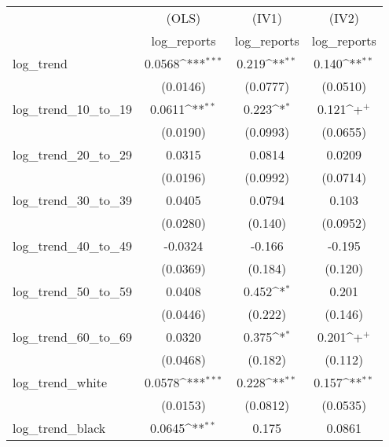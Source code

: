 {
\def\sym#1{\ifmmode^{#1}\else\(^{#1}\)\fi}
\begin{tabular}{l*{3}{c}}
\hline\hline
            &\multicolumn{1}{c}{(OLS)}&\multicolumn{1}{c}{(IV1)}&\multicolumn{1}{c}{(IV2)}\\
            &\multicolumn{1}{c}{log\_reports}&\multicolumn{1}{c}{log\_reports}&\multicolumn{1}{c}{log\_reports}\\
\hline
log\_trend   &      0.0568\sym{***}&       0.219\sym{**} &       0.140\sym{**} \\
            &    (0.0146)         &    (0.0777)         &    (0.0510)         \\
\hline
log\_trend\_10\_to\_19&      0.0611\sym{**} &       0.223\sym{*}  &       0.121\sym{+}  \\
            &    (0.0190)         &    (0.0993)         &    (0.0655)         \\
\hline
log\_trend\_20\_to\_29&      0.0315         &      0.0814         &      0.0209         \\
            &    (0.0196)         &    (0.0992)         &    (0.0714)         \\
\hline
log\_trend\_30\_to\_39&      0.0405         &      0.0794         &       0.103         \\
            &    (0.0280)         &     (0.140)         &    (0.0952)         \\
\hline
log\_trend\_40\_to\_49&     -0.0324         &      -0.166         &      -0.195         \\
            &    (0.0369)         &     (0.184)         &     (0.120)         \\
\hline
log\_trend\_50\_to\_59&      0.0408         &       0.452\sym{*}  &       0.201         \\
            &    (0.0446)         &     (0.222)         &     (0.146)         \\
\hline
log\_trend\_60\_to\_69&      0.0320         &       0.375\sym{*}  &       0.201\sym{+}  \\
            &    (0.0468)         &     (0.182)         &     (0.112)         \\
\hline
log\_trend\_white&      0.0578\sym{***}&       0.228\sym{**} &       0.157\sym{**} \\
            &    (0.0153)         &    (0.0812)         &    (0.0535)         \\
\hline
log\_trend\_black&      0.0645\sym{**} &       0.175         &      0.0861         \\

\end{tabular}}
